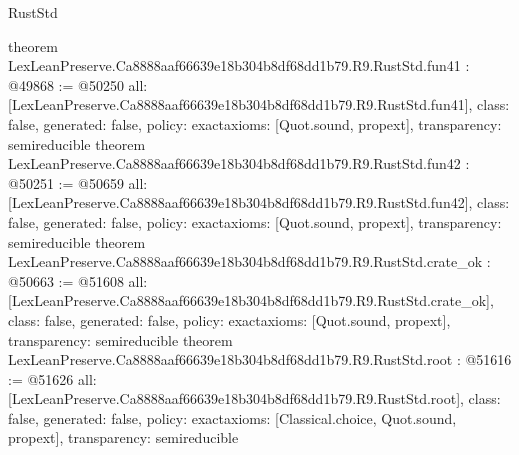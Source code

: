 \begin{lexlean}{RustStd}
\begin{coremodule}
{}
theorem LexLeanPreserve.Ca8888aaf66639e18b304b8df68dd1b79.R9.RustStd.fun41 : @49868 := @50250 {
  all: [LexLeanPreserve.Ca8888aaf66639e18b304b8df68dd1b79.R9.RustStd.fun41],
  class: false,
  generated: false,
  policy: exact{axioms: [Quot.sound, propext]},
  transparency: semireducible
}
theorem LexLeanPreserve.Ca8888aaf66639e18b304b8df68dd1b79.R9.RustStd.fun42 : @50251 := @50659 {
  all: [LexLeanPreserve.Ca8888aaf66639e18b304b8df68dd1b79.R9.RustStd.fun42],
  class: false,
  generated: false,
  policy: exact{axioms: [Quot.sound, propext]},
  transparency: semireducible
}
theorem LexLeanPreserve.Ca8888aaf66639e18b304b8df68dd1b79.R9.RustStd.crate_ok : @50663 := @51608 {
  all: [LexLeanPreserve.Ca8888aaf66639e18b304b8df68dd1b79.R9.RustStd.crate_ok],
  class: false,
  generated: false,
  policy: exact{axioms: [Quot.sound, propext]},
  transparency: semireducible
}
theorem LexLeanPreserve.Ca8888aaf66639e18b304b8df68dd1b79.R9.RustStd.root : @51616 := @51626 {
  all: [LexLeanPreserve.Ca8888aaf66639e18b304b8df68dd1b79.R9.RustStd.root],
  class: false,
  generated: false,
  policy: exact{axioms: [Classical.choice, Quot.sound, propext]},
  transparency: semireducible
}


\end{coremodule}
\end{lexlean}
